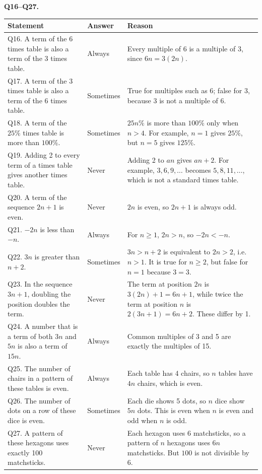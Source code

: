 \documentclass[11pt,a4paper]{article}
\begin{document}
\textbf{Q16--Q27.}
\begin{center}\small
\begin{tabular}{|p{6.4cm}|p{2.2cm}|p{6.2cm}|}\hline
\textbf{Statement} & \textbf{Answer} & \textbf{Reason}\\\hline
Q16. A term of the 6 times table is also a term of the 3 times table.
& Always
& Every multiple of 6 is a multiple of 3, since \(6n=3(2n)\).\\\hline
Q17. A term of the 3 times table is also a term of the 6 times table.
& Sometimes
& True for multiples such as 6; false for 3, because 3 is not a multiple of 6.\\\hline
Q18. A term of the \(25\%\) times table is more than \(100\%\).
& Sometimes
& \(25n\%\) is more than \(100\%\) only when \(n>4\). For example, \(n=1\) gives \(25\%\), but \(n=5\) gives \(125\%\).\\\hline
Q19. Adding 2 to every term of a times table gives another times table.
& Never
& Adding 2 to \(an\) gives \(an+2\). For example, \(3,6,9,\ldots\) becomes \(5,8,11,\ldots\), which is not a standard times table.\\\hline
Q20. A term of the sequence \(2n+1\) is even.
& Never
& \(2n\) is even, so \(2n+1\) is always odd.\\\hline
Q21. \(-2n\) is less than \(-n\).
& Always
& For \(n\ge1\), \(2n>n\), so \(-2n<-n\).\\\hline
Q22. \(3n\) is greater than \(n+2\).
& Sometimes
& \(3n>n+2\) is equivalent to \(2n>2\), i.e. \(n>1\). It is true for \(n\ge2\), but false for \(n=1\) because \(3=3\).\\\hline
Q23. In the sequence \(3n+1\), doubling the position doubles the term.
& Never
& The term at position \(2n\) is \(3(2n)+1=6n+1\), while twice the term at position \(n\) is \(2(3n+1)=6n+2\). These differ by 1.\\\hline
Q24. A number that is a term of both \(3n\) and \(5n\) is also a term of \(15n\).
& Always
& Common multiples of 3 and 5 are exactly the multiples of 15.\\\hline
Q25. The number of chairs in a pattern of these tables is even.
& Always
& Each table has 4 chairs, so \(n\) tables have \(4n\) chairs, which is even.\\\hline
Q26. The number of dots on a row of these dice is even.
& Sometimes
& Each die shows 5 dots, so \(n\) dice show \(5n\) dots. This is even when \(n\) is even and odd when \(n\) is odd.\\\hline
Q27. A pattern of these hexagons uses exactly 100 matchsticks.
& Never
& Each hexagon uses 6 matchsticks, so a pattern of \(n\) hexagons uses \(6n\) matchsticks. But \(100\) is not divisible by 6.\\\hline
\end{tabular}
\end{center}
\end{document}
